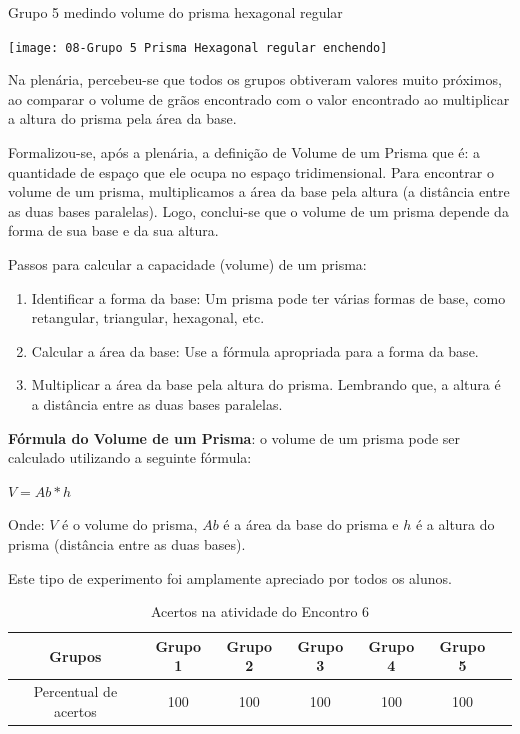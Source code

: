 \begin{CenteredFigure}
    \caption{Grupo 5 medindo volume do prisma hexagonal regular} \label{fig:8-medindo volume}
    \texttt{[image: 08-Grupo 5 Prisma Hexagonal regular enchendo]}
    \legend{\autoria}
\end{CenteredFigure}

Na plenária, percebeu-se que todos os grupos obtiveram valores muito próximos, ao comparar o volume de grãos encontrado com o valor encontrado ao multiplicar a altura do prisma pela área da base.

Formalizou-se, após a plenária, a definição de Volume de um Prisma que é: a quantidade de espaço que ele ocupa no espaço tridimensional. Para encontrar o volume de um prisma, multiplicamos a área da base pela altura (a distância entre as duas bases paralelas). Logo, conclui-se que o volume de um prisma depende da forma de sua base e da sua altura.

Passos para calcular a capacidade (volume) de um prisma:

\begin{enumerate}
    \item Identificar a forma da base: Um prisma pode ter várias formas de base, como retangular, triangular, hexagonal, etc.
    \item Calcular a área da base: Use a fórmula apropriada para a forma da base.
    \item Multiplicar a área da base pela altura do prisma. Lembrando que, a altura é a distância entre as duas bases paralelas.
\end{enumerate}

\textbf{Fórmula do Volume de um Prisma}: o volume de um prisma pode ser calculado utilizando a seguinte fórmula:

\textcolor[HTML]{0000FF}{$V = Ab * h$}

Onde: $V$ é o volume do prisma, $Ab$ é a área da base do prisma e $h$ é a altura do prisma (distância entre as duas bases).

Este tipo de experimento foi amplamente apreciado por todos os alunos.

\begin{table}[htbp] \centering
    \caption{Acertos na atividade do Encontro 6} \label{tab:Acertos do Encontro 6}
    \begin{tabular}{|c|c|c|c|c|c|c|}
        \hline
        \textbf{Grupos}       & \textbf{Grupo 1} & \textbf{Grupo 2} & \textbf{Grupo 3} & \textbf{Grupo 4} & \textbf{Grupo 5} \\
        \hline
        Percentual de acertos & 100              & 100              & 100              & 100              & 100              \\
        \hline
    \end{tabular}
    \legend{\legendaTabela}
\end{table}

